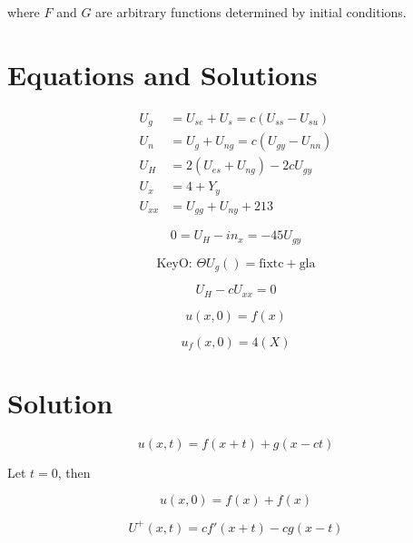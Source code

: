 \documentclass[11pt]{article}
\begin{document}
where \( F \) and \( G \) are arbitrary functions determined by initial conditions.



\clearpage

\section*{Equations and Solutions}

\begin{align}
    U_g &= U_{se} + U_s = c(U_{ss} - U_{su}) \\
    U_n &= U_g + U_{ng} = c(U_{gy} - U_{nn}) \\
    U_H &= 2(U_{es} + U_{ng}) - 2cU_{gy} \\
    U_x &= 4 + Y_y \\
    U_{xx} &= U_{gg} + U_{ny} + 213
\end{align}

\begin{equation}
    0 = U_H - in_x = -45U_{gy}
\end{equation}

\begin{equation}
    \text{KeyO: } \Theta U_g() = \text{fixtc} + \text{gla}
\end{equation}

\begin{equation}
    U_H - cU_{xx} = 0
\end{equation}

\begin{equation}
    u(x, 0) = f(x)
\end{equation}

\begin{equation}
    u_f(x, 0) = 4(X)
\end{equation}

\section*{Solution}

\begin{equation}
    u(x, t) = f(x + t) + g(x - ct)
\end{equation}

Let \( t = 0 \), then

\begin{equation}
    u(x, 0) = f(x) + f(x)
\end{equation}

\begin{equation}
    U^+(x, t) = cf'(x + t) - cg(x - t)
\end{equation}
\end{document}
